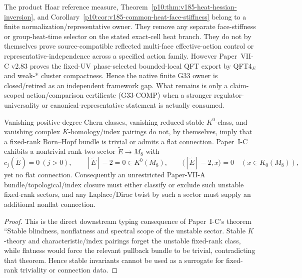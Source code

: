 \documentclass[12pt,a4paper]{article}
\begin{document}
\begin{corollary}
\label{p10:cor:v186-g33-finite-continuum-split}
The product Haar reference measure,
Theorem~\ref{p10:thm:v185-heat-hessian-inversion}, and
Corollary~\ref{p10:cor:v185-common-heat-face-stiffness} belong to a finite
normalization/representative owner.  They remove any separate face-stiffness
or group-heat-time selector on the stated exact-cell heat branch.  They do not by themselves prove source-compatible reflected multi-face effective-action control or representative-independence across a specified action family.  However Paper~VII-C v2.83 proves the fixed-UV phase-selected bounded-local QFT export by QFT4$_E$ and weak-* cluster compactness.  Hence the native finite G33 owner is closed/retired as an independent framework gap.  What remains is only a claim-scoped action/comparison certificate (G33-COMP) when a stronger regulator-universality or canonical-representative statement is actually consumed.
\end{corollary}

\begin{proposition}
\label{p10:prop:v152-unstable-fixed-rank-topology-firewall}
Vanishing positive-degree Chern classes, vanishing reduced stable
\(K^0\)-class, and vanishing complex \(K\)-homology/index pairings do not, by
themselves, imply that a fixed-rank Born--Hopf bundle is trivial or admits a
flat connection.  Paper~I-C exhibits a nontrivial rank-two sector
\(\widetilde E\to M_8\) with
\[
 c_j(\widetilde E)=0\ (j>0),\qquad
 [\widetilde E]-2=0\in K^0(M_8),\qquad
 \langle[\widetilde E]-2,x\rangle=0\quad(x\in K_0(M_8)),
\]
yet no flat connection.  Consequently an unrestricted Paper-VII-A
bundle/topological/index closure must either classify or exclude such
unstable fixed-rank sectors, and any Laplace/Dirac twist by such a sector must
supply an additional nonflat connection.
\end{proposition}
\begin{proof}
This is the direct downstream typing consequence of
Paper~I-C's theorem ``Stable blindness, nonflatness and spectral scope of the unstable sector.  Stable
\(K\)-theory and characteristic/index pairings forget the unstable fixed-rank
class, while flatness would force the relevant pullback bundle to be trivial,
contradicting that theorem.  Hence stable invariants cannot be used as a
surrogate for fixed-rank triviality or connection data.
\end{proof}
\end{document}
